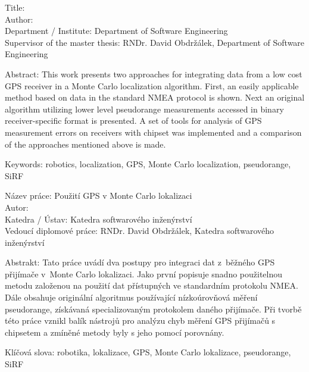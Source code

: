 \noindent
Title: \thetitle\\
Author: \theauthor\\
Department / Institute: Department of Software Engineering\\
Supervisor of the master thesis: RNDr. David Obdržálek, Department of Software Engineering

\vspace{5mm}

\noindent
Abstract: This work presents two approaches for integrating data from a low
cost GPS receiver in a Monte Carlo localization algorithm.
First, an easily applicable method based on data in the standard NMEA protocol is shown.
Next an original algorithm utilizing lower level pseudorange measurements accessed in
binary receiver-specific format is presented.
A set of tools for analysis of GPS measurement errors on receivers
with \sirf chipset was implemented and a comparison of the approaches mentioned above is made.

\vspace{5mm}

\noindent
Keywords: robotics, localization, GPS, Monte Carlo localization, pseudorange, SiRF

\vspace{25mm}

\noindent
Název práce: Použití GPS v Monte Carlo lokalizaci\\
Autor: \theauthor\\
Katedra / Ústav: Katedra softwarového inženýrství\\
Vedoucí diplomové práce: RNDr. David Obdržálek, Katedra softwarového inženýrství

\vspace{5mm}

\noindent
Abstrakt: Tato práce uvádí dva postupy pro integraci dat z~běžného GPS přijímače
v~Monte Carlo lokalizaci.
Jako první popisuje snadno použitelnou metodu založenou na použití dat přístupných ve standardním
protokolu NMEA.
Dále obsahuje originální algoritmus používající nízkoúrovňová měření pseudorange,
získávaná specializovaným protokolem daného přijímače.
Při tvorbě této práce vznikl balík nástrojů pro analýzu chyb měření GPS přijímačů
s chipsetem \sirf a zmíněné metody byly s jeho pomocí porovnány.

\vspace{5mm}

\noindent
Klíčová slova: robotika, lokalizace, GPS, Monte Carlo lokalizace, pseudorange, SiRF

\cleartorecto

